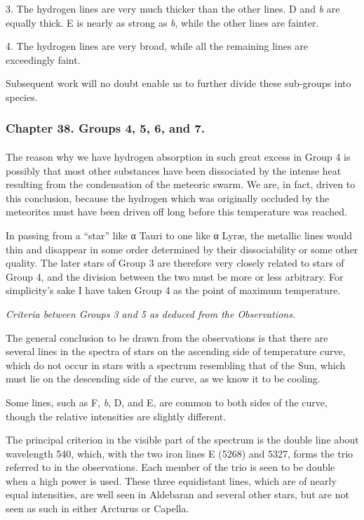 \documentclass[a4paper, 12pt, oneside, polutonikogreek, english]{article}
\begin{document}
3. The hydrogen lines are very much thicker than the other lines. D and \emph{b} are equally thick. E is nearly as strong as \emph{b}, while the other lines are fainter.

4. The hydrogen lines are very broad, while all the remaining lines are exceedingly faint.

Subsequent work will no doubt enable us to further divide these sub-groups into species.
\clearpage
\subsubsection{Chapter 38. Groups 4, 5, 6, and 7.}
\paragraph{}
The reason why we have hydrogen absorption in such great excess in Group 4 is possibly that most other substances have been dissociated by the intense heat resulting from the condensation of the meteoric swarm. We are, in fact, driven to this conclusion, because the hydrogen which was originally occluded by the meteorites must have been driven off long before this temperature was reached.

In passing from a ``star'' like α Tauri to one like α Lyræ, the metallic lines would thin and disappear in some order determined by their dissociability or some other quality. The later stars of Group 3 are therefore very closely related to stars of Group 4, and the division between the two must be more or less arbitrary. For simplicity's sake I have taken Group 4 as the point of maximum temperature.

\emph{Criteria between Groups 3 and 5 as deduced from the Observations.}

The general conclusion to be drawn from the observations is that there are several lines in the spectra of stars on the ascending side of temperature curve, which do not occur in stars with a spectrum resembling that of the Sun, which must lie on the descending side of the curve, as we know it to be cooling.

Some lines, such as F, \emph{b}, D, and E, are common to both sides of the curve, though the relative intensities are slightly different.

The principal criterion in the visible part of the spectrum is the double line about wavelength 540, which, with the two iron lines E (5268) and 5327, forms the trio referred to in the observations. Each member of the trio is seen to be double when a high power is used. These three equidistant lines, which are of nearly equal intensities, are well seen in Aldebaran and several other stars, but are not seen as such in either Arcturus or Capella.
\end{document}
